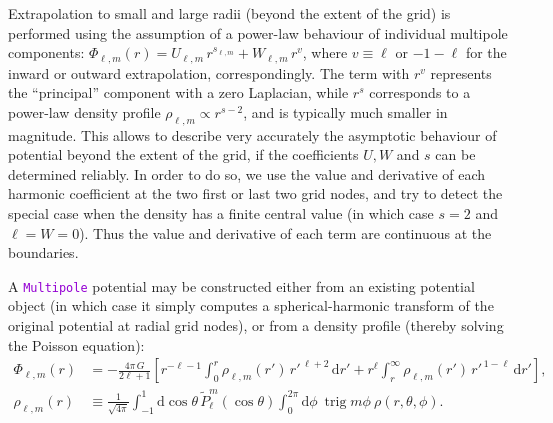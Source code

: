 \documentclass[12pt]{article}
\newcommand{\ttt}[1]{\textcolor{darkviolet}{\texttt{#1}}}
\renewcommand{\d}{\mathrm{d}}
\DeclareMathOperator{\trig}{trig}
\begin{document}
Extrapolation to small and large radii (beyond the extent of the grid) is performed using the assumption of a power-law behaviour of individual multipole components: $\Phi_{\ell,m}(r) = U_{\ell,m}\, r^{s_{\ell,m}} + W_{\ell,m}\, r^{v}$, where $v\equiv \ell$ or $-1-\ell$ for the inward or outward extrapolation, correspondingly. The term with $r^v$ represents the ``principal'' component with a zero Laplacian, while $r^s$ corresponds to a power-law density profile $\rho_{\ell,m}\propto r^{s-2}$, and is typically much smaller in magnitude. This allows to describe very accurately the asymptotic behaviour of potential beyond the extent of the grid, if the coefficients $U,W$ and $s$ can be determined reliably. In order to do so, we use the value and derivative of each harmonic coefficient at the two first or last two grid nodes, and try to detect the special case when the density has a finite central value (in which case $s=2$ and $\ell=W=0$). Thus the value and derivative of each term are continuous at the boundaries. 

A \ttt{Multipole} potential may be constructed either from an existing potential object (in which case it simply computes a spherical-harmonic transform of the original potential at radial grid nodes), or from a density profile (thereby solving the Poisson equation):
\begin{align}
\Phi_{\ell,m}(r) &= -\frac{4\pi\,G}{2\ell+1} \left[ r^{-\ell-1} \int_0^r \rho_{\ell,m}(r')\,{r'}^{\,\ell+2}\,\d r' + r^\ell\int_r^\infty \rho_{\ell,m}(r')\,{r'}^{\,1-\ell}\,\d r' \right],  \label{eq:SphHarmPoisson} \\
\rho_{\ell,m}(r) &\equiv \frac{1}{\sqrt{4\pi}} \int_{-1}^1 \d \cos\theta\, \tilde P_\ell^m(\cos\theta) \int_0^{2\pi}\d \phi\:\trig m\phi\:\rho(r,\theta,\phi) .  \label{eq:SphHarmDensity}
\end{align}
\end{document}
